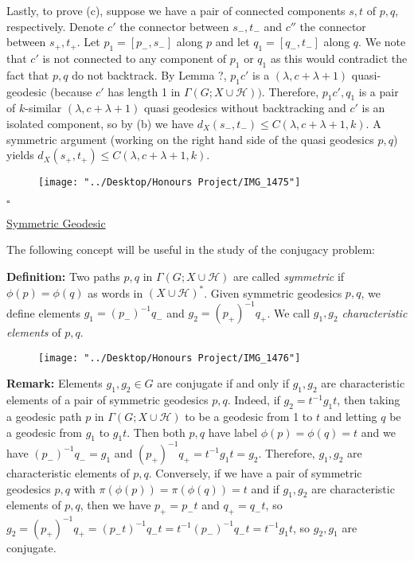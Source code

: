 \documentclass[12pt]{article}
\newcommand{\vs}{\vskip10pt}
\begin{document}
	\vs 
	
	Lastly, to prove (c), suppose we have a pair of connected components $s,t$ of $p,q$, respectively. Denote $c'$ the connector between $s_-, t_-$ and $c''$ the connector between $s_+, t_+$. Let $p_1 = [p_-, s_-]$ along $p$ and let $q_1 = [q_-, t_-]$ along $q$. We note that $c'$ is not connected to any component of $p_1$ or $q_1$ as this would contradict the fact that $p,q$ do not backtrack. By Lemma ?, $p_1 c'$ is a $(\lambda, c + \lambda + 1)$ quasi-geodesic (because $c'$ has length 1 in $\Gamma(G; X \cup \mathcal{H}))$. Therefore, $p_1 c', q_1$ is a pair of $k$-similar $(\lambda, c + \lambda + 1)$ quasi geodesics without backtracking and $c'$ is an isolated component, so by (b) we have $d_X(s_-, t_-) \leq C(\lambda, c + \lambda + 1, k)$. A symmetric argument (working on the right hand side of the quasi geodesics $p,q$) yields $d_X(s_+, t_+) \leq C(\lambda, c + \lambda + 1, k)$.
	
\begin{figure} [h]
	\centering
	\texttt{[image: "../Desktop/Honours Project/IMG\_1475"]}
	\caption{}
	\label{fig:img1475}
\end{figure}
	
	$\square$
	
	\vs
	
	\underline{Symmetric Geodesic}
	
	\vs 
	
	The following concept will be useful in the study of the conjugacy problem: 
	
	\vs 
	
	\textbf{Definition: } Two paths $p,q$ in $\Gamma(G; X \cup \mathcal{H})$ are called \textit{symmetric} if $\phi(p) = \phi(q)$ as words in $(X \cup \mathcal{H})^*$. Given symmetric geodesics $p,q$, we define elements $g_1 = (p_{-})^{-1} q_{-}$ and $g_2 = (p_{+})^{-1}q_{+}$. We call $g_1, g_2$ \textit{characteristic elements} of $p,q$.
	
\begin{figure}
	\centering
	\texttt{[image: "../Desktop/Honours Project/IMG\_1476"]}
	\caption{}
	\label{fig:img1476}
\end{figure}
	
	\vs 
	
	\textbf{Remark: } Elements $g_1, g_2 \in G$ are conjugate if and only if $g_1, g_2$ are characteristic elements of a pair of symmetric geodesics $p,q$. Indeed, if $g_2 = t^{-1} g_1 t$, then taking a geodesic path $p$ in $\Gamma(G; X \cup \mathcal{H})$ to be a geodesic from 1 to $t$ and letting $q$ be a geodesic from $g_1$ to $g_1 t$. Then both $p,q$ have label $\phi(p) = \phi(q) = t$ and we have $(p_{-})^{-1} q_{-} = g_1$ and $(p_{+})^{-1} q_{+} = t^{-1} g_1 t = g_2$. Therefore, $g_1, g_2$ are characteristic elements of $p,q$. Conversely, if we have a pair of symmetric geodesics $p,q$ with $\pi(\phi(p)) = \pi(\phi(q)) = t$ and if $g_1, g_2$ are characteristic elements of $p,q$, then we have $p_{+} = p_{-} t$ and $q_{+} = q_{-} t$, so $g_2 = (p_{+})^{-1}q_{+} = (p_{-} t)^{-1} q_{-} t = t^{-1} (p_{-})^{-1} q_{-} t = t^{-1} g_1 t$, so $g_2, g_1$ are conjugate.  
	
\end{document}
